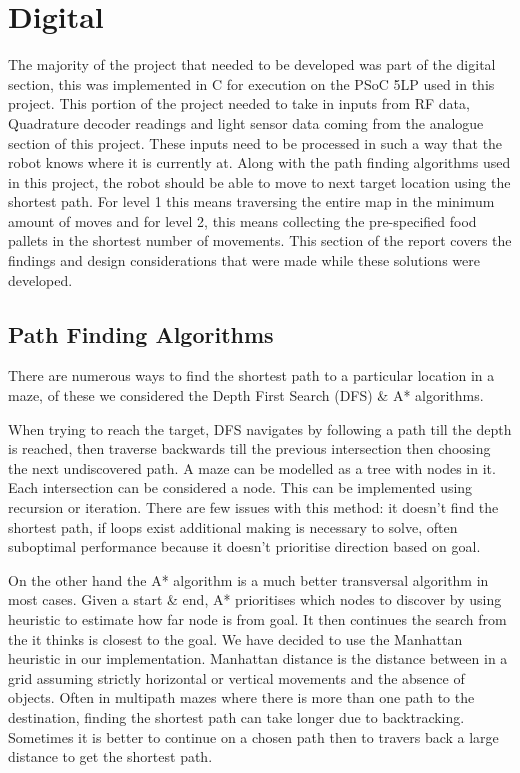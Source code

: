 \documentclass{article}
\begin{document}

\section{Digital}

The majority of the project that needed to be developed was part of the digital section, this was implemented in C for execution on the PSoC 5LP used in this project. This portion of the project needed to take in inputs from RF data, Quadrature decoder readings and light sensor data coming from the analogue section of this project. These inputs need to be processed in such a way that the robot knows where it is currently at. Along with the path finding algorithms used in this project, the robot should be able to move to next target location using the shortest path. For level 1 this means traversing the entire map in the minimum amount of moves and for level 2, this means collecting the pre-specified food pallets in the shortest number of movements. This section of the report covers the findings and design considerations that were made while these solutions were developed.

\subsection{Path Finding Algorithms}

There are numerous ways to find the shortest path to a particular location in a maze, of these we considered the Depth First Search (DFS) \& A* algorithms.

When trying to reach the target, DFS navigates by following a path till the depth is reached, then traverse backwards till the previous intersection then choosing the next undiscovered path. A maze can be modelled as a tree with nodes in it. Each intersection can be considered a node. This can be implemented using recursion or iteration. There are few issues with this method: it doesn't find the shortest path, if loops exist additional making is necessary to solve, often suboptimal performance because it doesn't prioritise direction based on goal.

On the other hand the A* algorithm is a much better transversal algorithm in most cases. Given a start \& end, A* prioritises which nodes to discover by using heuristic to estimate how far node is from goal. It then continues the search from the it thinks is closest to the goal. We have decided to use the Manhattan heuristic in our implementation. Manhattan distance is the distance between in a grid assuming strictly horizontal or vertical movements and the absence of objects. Often in multipath mazes where there is more than one path to the destination, finding the shortest path can take longer due to backtracking. Sometimes it is better to continue on a chosen path then to travers back a large distance to get the shortest path.
\end{document}
